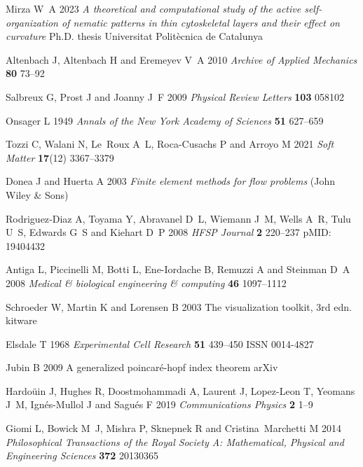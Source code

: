 \documentclass[12pt]{iopart}
\begin{document}
\begin{thebibliography}{100}
				Mirza W~A 2023 {\em A theoretical and computational study of the active
				  self-organization of nematic patterns in thin cytoskeletal layers and their
				  effect on curvature\/} Ph.D. thesis Universitat Polit{\`e}cnica de Catalunya
				
				Altenbach J, Altenbach H and Eremeyev V~A 2010 {\em Archive of Applied
				  Mechanics\/} {\bf 80} 73--92
				
				Salbreux G, Prost J and Joanny J~F 2009 {\em Physical Review Letters\/} {\bf
				  103} 058102
				
				Onsager L 1949 {\em Annals of the New York Academy of Sciences\/} {\bf 51}
				  627--659
				
				Tozzi C, Walani N, Le~Roux A~L, Roca-Cusachs P and Arroyo M 2021 {\em Soft
				  Matter\/} {\bf 17}(12) 3367--3379
				
				Donea J and Huerta A 2003 {\em Finite element methods for flow problems\/}
				  (John Wiley \& Sons)
				
				Rodriguez‐Diaz A, Toyama Y, Abravanel D~L, Wiemann J~M, Wells A~R, Tulu U~S,
				  Edwards G~S and Kiehart D~P 2008 {\em HFSP Journal\/} {\bf 2} 220--237 pMID:
				  19404432
				
				Antiga L, Piccinelli M, Botti L, Ene-Iordache B, Remuzzi A and Steinman D~A
				  2008 {\em Medical \& biological engineering \& computing\/} {\bf 46}
				  1097--1112
				
				Schroeder W, Martin K and Lorensen B 2003 The visualization toolkit, 3rd edn.
				  kitware
				
				Elsdale T 1968 {\em Experimental Cell Research\/} {\bf 51} 439--450 ISSN
				  0014-4827
				
				Jubin B 2009 A generalized poincar{\'e}-hopf index theorem arXiv
				
				Hardo{\"u}in J, Hughes R, Doostmohammadi A, Laurent J, Lopez-Leon T, Yeomans
				  J~M, Ign{\'e}s-Mullol J and Sagu{\'e}s F 2019 {\em Communications Physics\/}
				  {\bf 2} 1--9
				
				Giomi L, Bowick M~J, Mishra P, Sknepnek R and Cristina~Marchetti M 2014 {\em
				  Philosophical Transactions of the Royal Society A: Mathematical, Physical and
				  Engineering Sciences\/} {\bf 372} 20130365
				

\end{thebibliography}
\end{document}

